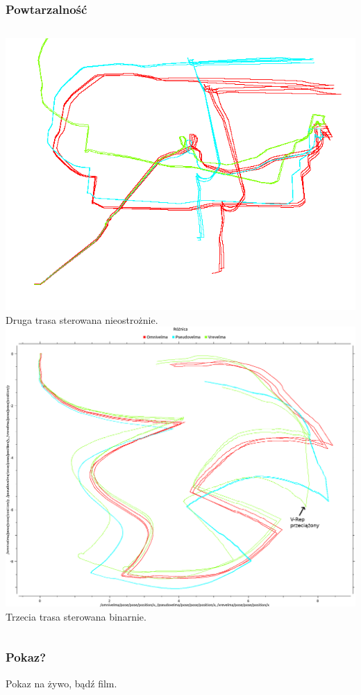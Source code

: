\documentclass{beamer}
\begin{document}
	\begin{frame}
		\frametitle{Powtarzalność}
		\begin{columns}[c]
			\centering
			\includegraphics[width=\textwidth]{graphics/bag_2.png} \\
			Druga trasa sterowana nieostrożnie.
			\centering
			\includegraphics[width=\textwidth]{graphics/bag_3.png} \\
			Trzecia trasa sterowana binarnie.
		\end{columns}
	\end{frame}
	\begin{frame}
		\frametitle{Pokaz?}
		Pokaz na żywo, bądź film.
	\end{frame}
 
\end{document}
